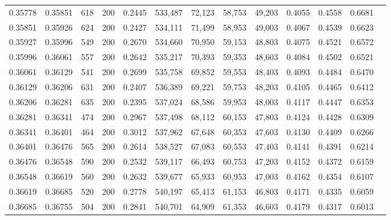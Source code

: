 \begin{tabular}{rrrrrrrrrrrrr}
0.35778 & 0.35851 &    618 & 200 &                                     0.2445 & 533,487 &  72,123 &  58,753 &  49,203 & 0.4055 & 0.4558 & 0.6681 \\
0.35851 & 0.35926 &    624 & 200 &                                     0.2427 & 534,111 &  71,499 &  58,953 &  49,003 & 0.4067 & 0.4539 & 0.6623 \\
0.35927 & 0.35996 &    549 & 200 &                                     0.2670 & 534,660 &  70,950 &  59,153 &  48,803 & 0.4075 & 0.4521 & 0.6572 \\
0.35996 & 0.36061 &    557 & 200 &                                     0.2642 & 535,217 &  70,393 &  59,353 &  48,603 & 0.4084 & 0.4502 & 0.6521 \\
0.36061 & 0.36129 &    541 & 200 &                                     0.2699 & 535,758 &  69,852 &  59,553 &  48,403 & 0.4093 & 0.4484 & 0.6470 \\
0.36129 & 0.36206 &    631 & 200 &                                     0.2407 & 536,389 &  69,221 &  59,753 &  48,203 & 0.4105 & 0.4465 & 0.6412 \\
0.36206 & 0.36281 &    635 & 200 &                                     0.2395 & 537,024 &  68,586 &  59,953 &  48,003 & 0.4117 & 0.4447 & 0.6353 \\
0.36281 & 0.36341 &    474 & 200 &                                     0.2967 & 537,498 &  68,112 &  60,153 &  47,803 & 0.4124 & 0.4428 & 0.6309 \\
0.36341 & 0.36401 &    464 & 200 &                                     0.3012 & 537,962 &  67,648 &  60,353 &  47,603 & 0.4130 & 0.4409 & 0.6266 \\
0.36401 & 0.36476 &    565 & 200 &                                     0.2614 & 538,527 &  67,083 &  60,553 &  47,403 & 0.4141 & 0.4391 & 0.6214 \\
0.36476 & 0.36548 &    590 & 200 &                                     0.2532 & 539,117 &  66,493 &  60,753 &  47,203 & 0.4152 & 0.4372 & 0.6159 \\
0.36548 & 0.36619 &    560 & 200 &                                     0.2632 & 539,677 &  65,933 &  60,953 &  47,003 & 0.4162 & 0.4354 & 0.6107 \\
0.36619 & 0.36685 &    520 & 200 &                                     0.2778 & 540,197 &  65,413 &  61,153 &  46,803 & 0.4171 & 0.4335 & 0.6059 \\
0.36685 & 0.36755 &    504 & 200 &                                     0.2841 & 540,701 &  64,909 &  61,353 &  46,603 & 0.4179 & 0.4317 & 0.6013 \\

\end{tabular}
